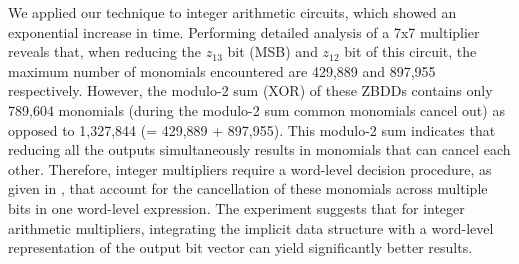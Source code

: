 We applied our technique to integer arithmetic circuits, which showed an exponential increase in time. Performing detailed analysis of a 7x7 multiplier reveals that, when reducing the $z_{13}$ bit (MSB) and $z_{12}$ bit of this
circuit, the maximum number of monomials encountered are 429,889 and 897,955 respectively. 
However, the modulo-2 sum (XOR) of these ZBDDs contains only 789,604 monomials 
(during the modulo-2 sum common monomials cancel out) as opposed to 1,327,844 (= 429,889 + 897,955). 
This modulo-2 sum indicates that reducing all the outputs simultaneously results 
in monomials that can cancel each other. Therefore, integer multipliers require a word-level
decision procedure, as given in \cite{ciesielski:dac2015}
\cite{rolf:date16}, that account for the cancellation of these
monomials across multiple bits in one word-level expression. The experiment suggests that for integer 
arithmetic multipliers, integrating the implicit data structure with a word-level 
representation of the output bit vector can yield significantly better results.




